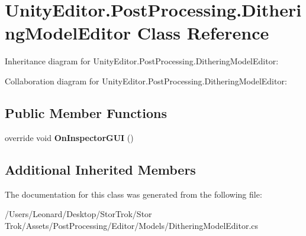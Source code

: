 \hypertarget{class_unity_editor_1_1_post_processing_1_1_dithering_model_editor}{}\section{Unity\+Editor.\+Post\+Processing.\+Dithering\+Model\+Editor Class Reference}
\label{class_unity_editor_1_1_post_processing_1_1_dithering_model_editor}


Inheritance diagram for Unity\+Editor.\+Post\+Processing.\+Dithering\+Model\+Editor\+:


Collaboration diagram for Unity\+Editor.\+Post\+Processing.\+Dithering\+Model\+Editor\+:
\subsection*{Public Member Functions}
\begin{DoxyCompactItemize}
\item 
\mbox{\label{class_unity_editor_1_1_post_processing_1_1_dithering_model_editor_a32cce7225dccf96fea7c0d1bc9ff8384}} 
override void {\bfseries On\+Inspector\+G\+UI} ()
\end{DoxyCompactItemize}
\subsection*{Additional Inherited Members}


The documentation for this class was generated from the following file\+:\begin{DoxyCompactItemize}
\item 
/\+Users/\+Leonard/\+Desktop/\+Stor\+Trok/\+Stor Trok/\+Assets/\+Post\+Processing/\+Editor/\+Models/Dithering\+Model\+Editor.\+cs\end{DoxyCompactItemize}

